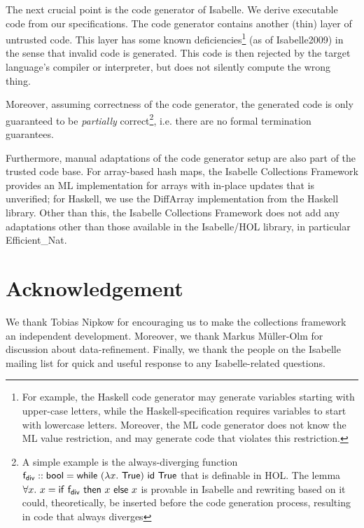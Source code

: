   The next crucial point is the code generator of Isabelle. We derive executable code from our specifications. The code generator contains another (thin) layer of untrusted code. This layer has some known deficiencies\footnote{For example, the Haskell code generator may generate variables starting with upper-case letters, while the Haskell-specification requires variables to start with lowercase letters. Moreover, the ML code generator does not know the ML value restriction, and may generate code that violates this restriction.} (as of Isabelle2009) in the sense that invalid code is generated. This code is then rejected by the target language's compiler or interpreter, but does not silently compute the wrong thing. 

  Moreover, assuming correctness of the code generator, the generated code is only guaranteed to be {\em partially} correct\footnote{A simple example is the always-diverging function ${\sf f_{div}}::{\sf bool} = {\sf while}~(\lambda x.~{\sf True})~{\sf id}~{\sf True}$ that is definable in HOL. The lemma $\forall x.~ x = {\sf if}~{\sf f_{div}}~{\sf then}~x~{\sf else}~x$ is provable in Isabelle and rewriting based on it could, theoretically, be inserted before the code generation process, resulting in code that always diverges}, i.e. there are no formal termination guarantees.

  Furthermore, manual adaptations of the code generator setup are also part of the trusted code base.
  For array-based hash maps, the Isabelle Collections Framework provides an ML implementation for arrays with in-place updates that is unverified; for Haskell, we use the DiffArray implementation from the Haskell library.
  Other than this, the Isabelle Collections Framework does not add any adaptations other than those available in the Isabelle/HOL library, in particular Efficient\_Nat.

\section{Acknowledgement}
We thank Tobias Nipkow for encouraging us to make the collections framework an independent development. Moreover, we thank Markus M\"uller-Olm for discussion about data-refinement. Finally, we thank the people on the Isabelle mailing list for quick and useful response to any Isabelle-related questions.
